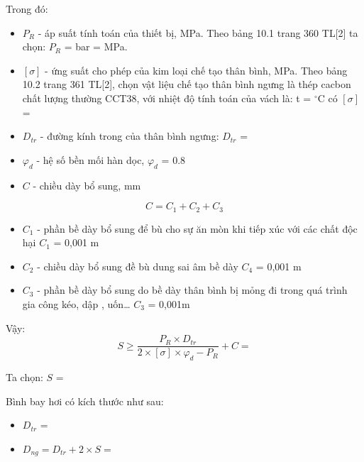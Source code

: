 Trong đó:
\begin{itemize}
	\item $P_{R}$ - áp suất tính toán của thiết bị, MPa. Theo bảng 10.1 trang 360 TL[2] ta chọn: $P_{R}$ =  bar =  MPa.
	\item $[\sigma]$ - ứng suất cho phép của kim loại chế tạo thân bình, MPa. Theo bảng 10.2 trang 361 TL[2], chọn vật liệu chế tạo thân bình ngưng là thép cacbon chất lượng thường CCT38, với nhiệt độ tính toán của vách là: t = $^{\circ}$C có $[\sigma]$ = 
	\item $D_{tr}$ - đường kính trong của thân bình ngưng: $D_{tr}$ = 
	\item $\varphi_{d}$ - hệ số bền mối hàn dọc, $\varphi_{d}$ = 0.8
	\item $C$ - chiều dày bổ sung, mm
\end{itemize}
\begin{equation*}
	C = C_{1} + C_{2} + C_{3}
\end{equation*}
\begin{itemize}
	\item $C_{1}$ - phần bề dày bổ sung để bù cho sự ăn mòn khi tiếp xúc với các	chất độc hại $C_{1}$ = 0,001 m
	\item $C_{2}$ - chiều dày bổ sung đề bù dung sai âm bề dày $C_{4}$ = 0,001 m
	\item $C_{3}$ - phần bề dày bổ sung do bề dày thân bình bị mỏng đi trong quá trình gia công kéo, dập , uốn… $C_{3}$ = 0,001m
\end{itemize}

Vậy:
\begin{equation*}
	S \geq \dfrac{P_{R}\times D_{tr}}{2\times [\sigma]\times\varphi_{d} - P_{R}} + C = 
\end{equation*}

Ta chọn: $S$ =

Bình bay hơi có kích thước như sau:
\begin{itemize}[label={$\diamond$}]
	\item $D_{tr}$ = 
	\item $D_{ng} = D_{tr} + 2\times S = $ 
\end{itemize}










